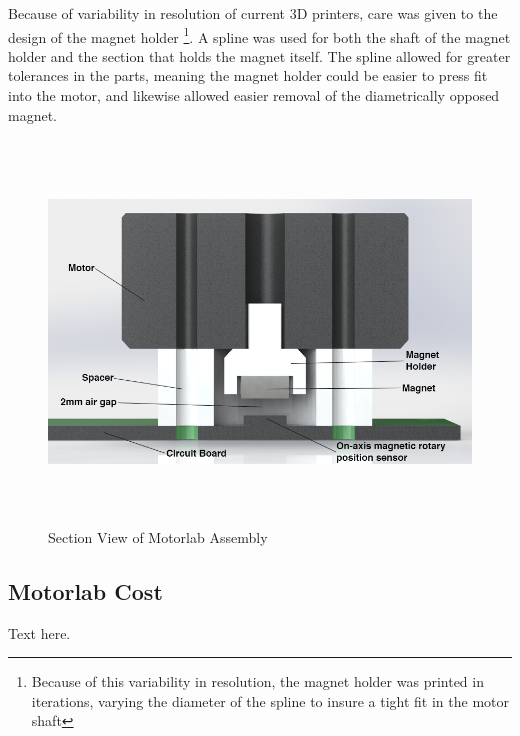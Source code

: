 Because of variability in resolution of current 3D printers, care was given to the design of the magnet holder \footnote{Because of this variability in resolution, the magnet holder was printed in iterations, varying the diameter of the spline to insure a tight fit in the motor shaft}. A spline was used for both the shaft of the magnet holder and the section that holds the magnet itself. The spline allowed for greater tolerances in the parts, meaning the magnet holder could be easier to press fit into the motor, and likewise allowed easier removal of the diametrically opposed magnet.

\begin{figure}[htb]%

    \includegraphics[height=4in]{figures/section_view_motorlab_assembly.png}

    \caption[Section View of Motorlab Assembly]{Section View of Motorlab Assembly}

    \label{section_view_motorlab}
\end{figure}

\subsection{Motorlab Cost}
\label{makereference2.1.4} 

Text here.


